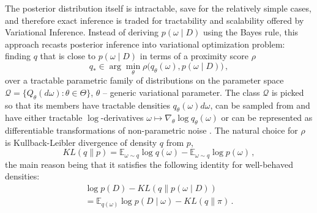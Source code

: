 \documentclass[a4paper,10pt]{article}
\begin{document}
The posterior distribution itself is intractable, save for the relatively simple cases, and
therefore exact inference is traded for tractability and scalability offered by Variational
Inference. Instead of deriving $p(\omega \mid D)$ using the Bayes rule, this approach recasts
posterior inference into variational optimization problem: finding $q$ that is close to
$p(\omega \mid D)$ in terms of a proximity score $\rho$
\begin{equation}  \label{eq:variational-progam}
  q_*
    \in \arg \min_{\theta} \rho\bigl(
      q_\theta(\omega), p(\omega \mid D)
    \bigr)
    \,,
\end{equation}
over a tractable parametric family of distributions on the parameter space $
  \mathcal{Q} = \{Q_\theta(d\omega) \colon \theta \in \Theta\}
$, $\theta$ -- generic variational parameter. The class $\mathcal{Q}$ is picked so that
its members have tractable densities $
  q_\theta(\omega) d\omega
$, can be sampled from and have either tractable $\log$-derivatives $
  \omega \mapsto \nabla_\theta \log q_\theta(\omega)
$ \citep{williams_simple_1992} or can be represented as differentiable transformations
of non-parametric noise \citep{kingma_auto-encoding_2014,figurnov_implicit_2019}.
%
The natural choice for $\rho$ is Kullback-Leibler divergence of density $q$ from $p$,
\begin{equation}  \label{eq:kl-div-def}
  KL(q \| p)
    = \mathbb{E}_{\omega \sim q}
      \log{q(\omega)}
    - \mathbb{E}_{\omega \sim q}
      \log{p(\omega)}
    \,,
\end{equation}
the main reason being that it satisfies the following identity for well-behaved densities:
\begin{multline}  \label{eq:kl-div-master}
  \log p(D)
    - KL(q \| p(\omega \mid D))
    \\ = \mathbb{E}_{q(\omega)} \log{p(D \mid \omega)}
    - KL(q \| \pi)
    \,.
\end{multline}
\end{document}
